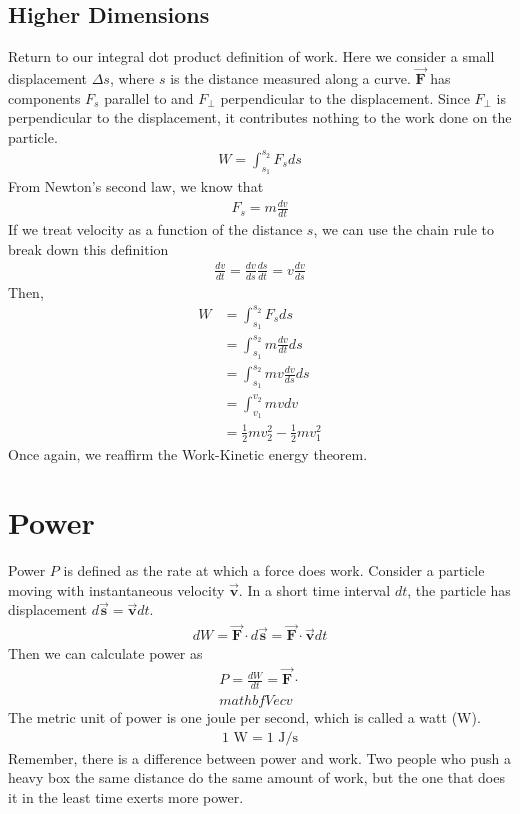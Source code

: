 \documentclass[11pt]{article}
\begin{document}
\subsection{Higher Dimensions}
Return to our integral dot product definition of work. Here we consider a small displacement $\Delta s$, where $s$ is the distance measured along a curve. $\mathbf{\Vec{F}}$ has components $F_s$ parallel to and $F_\perp$ perpendicular to the displacement. Since $F_\perp$ is perpendicular to the displacement, it contributes nothing to the work done on the particle. 
\begin{align*}
    W = \int_{s_1}^{s_2} F_s ds
\end{align*}
From Newton's second law, we know that
\begin{align*}
    F_s = m \frac{dv}{dt}
\end{align*}
If we treat velocity as a function of the distance $s$, we can use the chain rule to break down this definition
\begin{align*}
    \frac{dv}{dt} = \frac{dv}{ds}\frac{ds}{dt} = v\frac{dv}{ds}
\end{align*}
Then,
\begin{align*}
    W &= \int_{s_1}^{s_2} F_s ds \\
    &= \int_{s_1}^{s_2} m\frac{dv}{dt}ds \\
    &= \int_{s_1}^{s_2} mv\frac{dv}{ds}ds \\
    &= \int_{v_1}^{v_2} mv dv \\
    &= \frac{1}{2}mv_2^2 - \frac{1}{2}mv_1^2
\end{align*}
Once again, we reaffirm the Work-Kinetic energy theorem.

\section{Power}
Power $P$ is defined as the rate at which a force does work. Consider a particle moving with instantaneous velocity $\mathbf{\Vec{v}}$. In a short time interval $dt$, the particle has displacement $d\mathbf{\Vec{s}} = \mathbf{\Vec{v}}dt$. 
\begin{align*}
    dW = \mathbf{\Vec{F}}\cdot d\mathbf{\Vec{s}} = \mathbf{\Vec{F}}\cdot\mathbf{\Vec{v}}dt
\end{align*}
Then we can calculate power as
\begin{align*}
    P = \frac{dW}{dt} = \mathbf{\Vec{F}}\cdot\\mathbf{Vec{v}}
\end{align*}
The metric unit of power is one joule per second, which is called a watt (W).
\begin{align*}
    1\text{ W} = 1\text{ J}/\text{s}
\end{align*}
Remember, there is a difference between power and work. Two people who push a heavy box the same distance do the same amount of work, but the one that does it in the least time exerts more power. 
\end{document}
